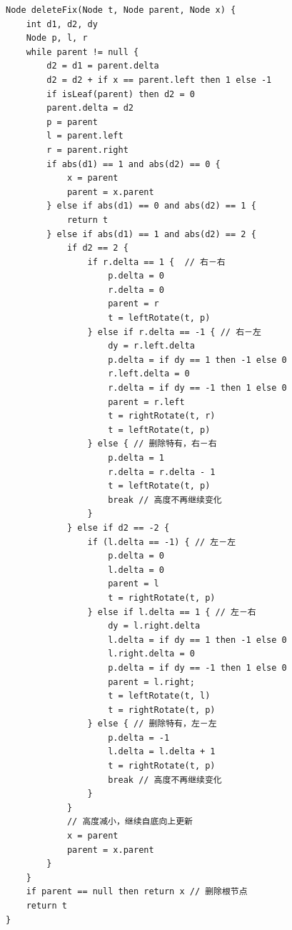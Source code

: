 \documentclass[b5paper]{ctexart}
\begin{document}
\begin{lstlisting}[language = Bourbaki]
Node deleteFix(Node t, Node parent, Node x) {
    int d1, d2, dy
    Node p, l, r
    while parent != null {
        d2 = d1 = parent.delta
        d2 = d2 + if x == parent.left then 1 else -1
        if isLeaf(parent) then d2 = 0
        parent.delta = d2
        p = parent
        l = parent.left
        r = parent.right
        if abs(d1) == 1 and abs(d2) == 0 {
            x = parent
            parent = x.parent
        } else if abs(d1) == 0 and abs(d2) == 1 {
            return t
        } else if abs(d1) == 1 and abs(d2) == 2 {
            if d2 == 2 {
                if r.delta == 1 {  // 右－右
                    p.delta = 0
                    r.delta = 0
                    parent = r
                    t = leftRotate(t, p)
                } else if r.delta == -1 { // 右－左
                    dy = r.left.delta
                    p.delta = if dy == 1 then -1 else 0
                    r.left.delta = 0
                    r.delta = if dy == -1 then 1 else 0
                    parent = r.left
                    t = rightRotate(t, r)
                    t = leftRotate(t, p)
                } else { // 删除特有，右－右
                    p.delta = 1
                    r.delta = r.delta - 1
                    t = leftRotate(t, p)
                    break // 高度不再继续变化
                }
            } else if d2 == -2 {
                if (l.delta == -1) { // 左－左
                    p.delta = 0
                    l.delta = 0
                    parent = l
                    t = rightRotate(t, p)
                } else if l.delta == 1 { // 左－右
                    dy = l.right.delta
                    l.delta = if dy == 1 then -1 else 0
                    l.right.delta = 0
                    p.delta = if dy == -1 then 1 else 0
                    parent = l.right;
                    t = leftRotate(t, l)
                    t = rightRotate(t, p)
                } else { // 删除特有，左－左
                    p.delta = -1
                    l.delta = l.delta + 1
                    t = rightRotate(t, p)
                    break // 高度不再继续变化
                }
            }
            // 高度减小，继续自底向上更新
            x = parent
            parent = x.parent
        }
    }
    if parent == null then return x // 删除根节点
    return t
}
\end{lstlisting}

\ifx\wholebook\relax \else


\end{document}
